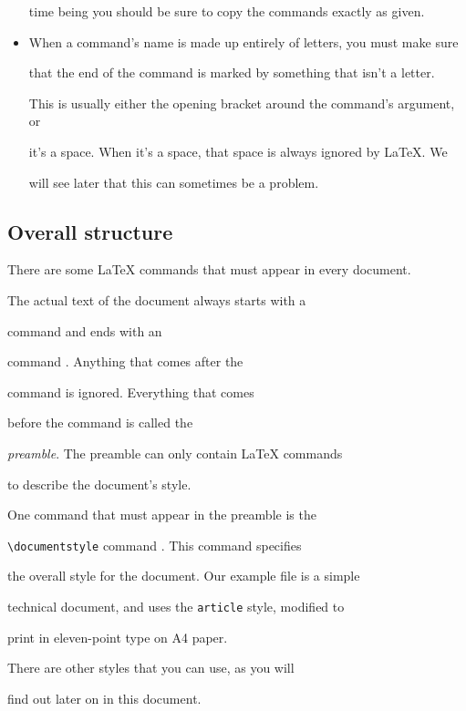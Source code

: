 \begin{itemize}
time being you should be sure to copy the commands exactly as given.



\item When a command's name is made up entirely of letters, you must make sure

that the end of the command is marked by something that isn't a letter.

This is usually either the opening bracket around the command's argument, or

it's a space.  When it's a space, that space is always ignored by \LaTeX. We

will see later that this can sometimes be a problem.



\end{itemize}



\subsection{Overall structure}



There are some \LaTeX{} commands that must appear in every document.

The actual text of the document always starts with a

\verb|| command and ends with an \verb||

command .  Anything that comes after the

\verb|| command is ignored.  Everything that comes

before the \verb|| command is called the

{\em preamble\/}. The preamble can only contain \LaTeX{} commands

to describe the document's style.



One command that must appear in the preamble is the

\verb|\documentstyle| command .  This command specifies

the overall style for the document.  Our example file is a simple

technical document, and uses the {\tt article\/} style, modified to

print in eleven-point type on A4 paper.

There are other styles that you can use, as you will

find out later on in this document.



